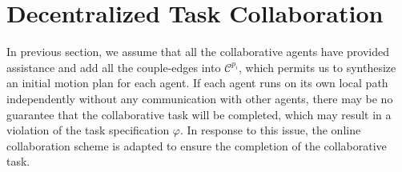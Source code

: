 \documentclass[journal]{IEEEtran}
\begin{document}
\section{Decentralized Task Collaboration}
In previous section, we assume that all the collaborative agents have provided assistance and add all the couple-edges into $\mathcal{C}^{p_i}$, which permits us to synthesize an initial motion plan for each agent. If each agent runs on its own local path independently without any communication with other agents, there may be no guarantee that the collaborative task will be completed, which may result in a violation of the task specification $\varphi$. In response to this issue, the online collaboration scheme is adapted to ensure the completion of the collaborative task.
\end{document}
